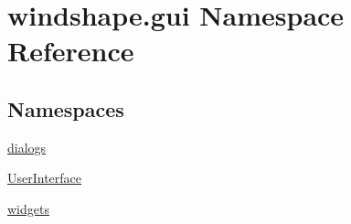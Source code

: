 \hypertarget{namespacewindshape_1_1gui}{}\section{windshape.\+gui Namespace Reference}
\label{namespacewindshape_1_1gui}
\subsection*{Namespaces}
\begin{DoxyCompactItemize}
\item 
 \mbox{\hyperlink{namespacewindshape_1_1gui_1_1dialogs}{dialogs}}
\item 
 \mbox{\hyperlink{namespacewindshape_1_1gui_1_1_user_interface}{User\+Interface}}
\item 
 \mbox{\hyperlink{namespacewindshape_1_1gui_1_1widgets}{widgets}}
\end{DoxyCompactItemize}
